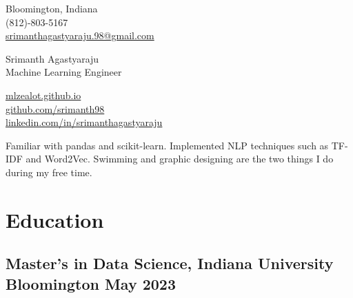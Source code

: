 \documentclass[a4,10pt]{article}
\begin{document}
\begin{center}
    \begin{minipage}[b]{0.24\textwidth}
            \small Bloomington, Indiana \\
            \small (812)-803-5167 \\
            \small \href{mailto:srimanthagastyaraju.98@gmail.com}{srimanthagastyaraju.98@gmail.com}
    \end{minipage}%
    \begin{minipage}[b]{0.5\textwidth}
            \centering
            {\HUGE Srimanth Agastyaraju} \\ %
            \vspace{0.1cm}
            {\color{UI_blue} \Large{Machine Learning Engineer}} \\
    \end{minipage}%
    \begin{minipage}[b]{0.24\textwidth}
            \flushright \small  %
            {\href{https://mlzealot.github.io/}{mlzealot.github.io}} \\
            {\href{https://github.com/srimanth98}{github.com/srimanth98}} \\
            \href{https://www.linkedin.com/in/srimanthagastyaraju/}{linkedin.com/in/srimanthagastyaraju}
    \end{minipage}   
    
\vspace{-0.15cm} 
{\color{UI_blue} \hrulefill}
\end{center}
\vspace{-0.2cm}
Familiar with pandas and scikit-learn. Implemented NLP techniques such as TF-IDF and Word2Vec. Swimming and graphic designing are the two things I do during my free time.
\vspace{-0.2cm}



\section{Education }
\subsection*{Master’s in Data Science, {\normalsize \normalfont Indiana University Bloomington} \hfill May 2023} 
\vspace{0.1cm}
\end{document}
